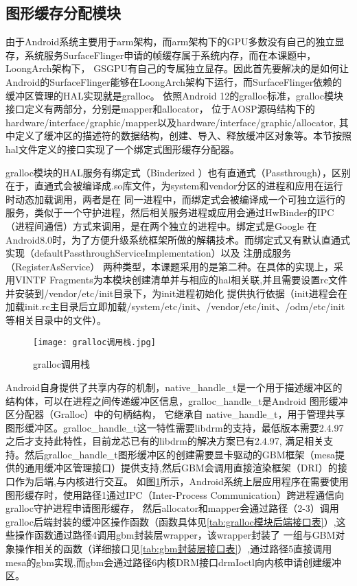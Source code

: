 

\subsection{图形缓存分配模块}
由于Android系统主要用于arm架构，而arm架构下的GPU多数没有自己的独立显存，系统服务SurfaceFlinger申请的帧缓存属于系统内存，而在本课题中，LoongArch架构下，
GSGPU有自己的专属独立显存。因此首先要解决的是如何让Android的SurfaceFlinger能够在LoongArch架构下运行，而SurfaceFlinger依赖的缓冲区管理的HAL实现就是gralloc。
依照Android 12的gralloc标准，gralloc模块接口定义有两部分，分别是mapper和allocator，
位于AOSP源码结构下的hardware/interface/graphic/mapper以及hardware/interface/graphic/allocator,
其中定义了缓冲区的描述符的数据结构，创建、导入、释放缓冲区对象等。本节按照hal文件定义的接口实现了一个绑定式图形缓存分配器。

gralloc模块的HAL服务有绑定式（Binderized ）也有直通式（Passthrough），区别在于，直通式会被编译成.so库文件，为system和vendor分区的进程和应用在运行时动态加载调用，两者是在
同一进程中，而绑定式会被编译成一个可独立运行的服务，类似于一个守护进程，然后相关服务进程或应用会通过HwBinder的IPC（进程间通信）方式来调用，是在两个独立的进程中。绑定式是Google
在Android8.0时，为了方便升级系统框架所做的解耦技术。而绑定式又有默认直通式实现（defaultPassthroughServiceImplementation）以及 注册成服务（RegisterAsService）
两种类型，本课题采用的是第二种。在具体的实现上，采用VINTF Fragments为本模块创建清单并与相应的hal相关联,并且需要设置rc文件并安装到/vendor/etc/init目录下，为init进程初始化
提供执行依据（init进程会在加载init.rc主目录后立即加载/system/etc/init、/vendor/etc/init、/odm/etc/init等相关目录中的文件）。

\begin{figure}[h]
  \centering
  \texttt{[image: gralloc调用栈.jpg]}
  \caption{gralloc调用栈}
  \label{fig:gralloc调用栈}
\end{figure}

Android自身提供了共享内存的机制，native\_handle\_t是一个用于描述缓冲区的结构体，可以在进程之间传递缓冲区信息，gralloc\_handle\_t是Android 图形缓冲区分配器（Gralloc）中的句柄结构，
它继承自 native\_handle\_t，用于管理共享图形缓冲区。gralloc\_handle\_t这一特性需要libdrm的支持，最低版本需要2.4.97之后才支持此特性，目前龙芯已有的libdrm的解决方案已有2.4.97,
满足相关支持。然后gralloc\_handle\_t图形缓冲区的创建需要显卡驱动的GBM框架（mesa提供的通用缓冲区管理接口）提供支持,然后GBM会调用直接渲染框架（DRI）的接口作为后端,与内核进行交互。
如图\ref{fig:gralloc调用栈}所示，Android系统上层应用程序在需要使用图形缓存时，使用路径1通过IPC（Inter-Process Communication）跨进程通信向gralloc守护进程申请图形缓存，
然后allocator和mapper会通过路径（2-3）调用gralloc后端封装的缓冲区操作函数（函数具体见\ref{tab:gralloc模块后端接口表}）,这些操作函数通过路径4调用gbm封装层wrapper，该wrapper封装了
一组与GBM对象操作相关的函数（详细接口见\ref{tab:gbm封装层接口表}）,通过路径5直接调用mesa的gbm实现,而gbm会通过路径6内核DRM接口drmIoctl向内核申请创建缓冲区。

